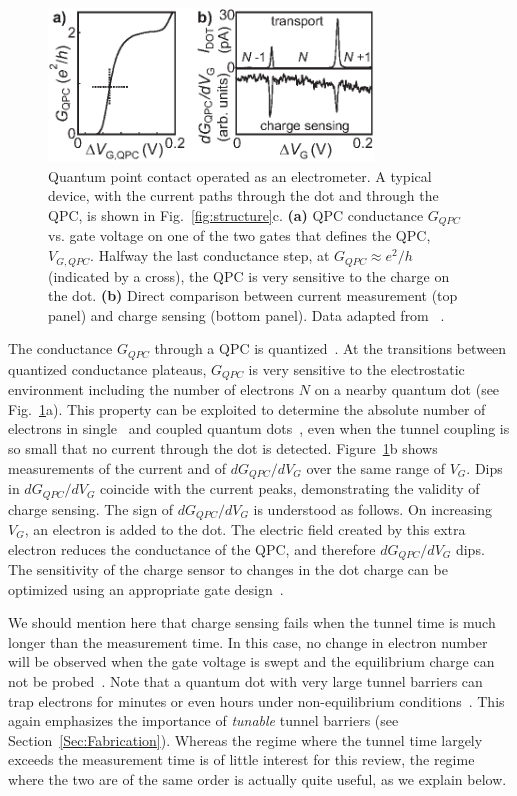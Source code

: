 \documentclass[rmp,twocolumn,aps]{revtex4}
\begin{document}
\begin{figure}[htb]
\includegraphics[width=3.4in]{hanson_fig11.eps}
\caption{Quantum point contact operated as an electrometer. A typical device, with the current paths through the dot and through the QPC, is shown in Fig.~\ref{fig:structure}c.
\textbf{(a)} QPC conductance $G_{QPC}$ vs. gate voltage on one of
the two gates that defines the QPC, $V_{G,QPC}$. Halfway the last
conductance step, at $G_{QPC}\approx e^2/h$ (indicated by a
cross), the QPC is very sensitive to the charge on the dot.
\textbf{(b)} Direct comparison between current measurement (top
panel) and charge sensing (bottom panel). Data adapted from
~\textcite{ElzermanPRB2003}.} \label{fig:chargesensing}
\end{figure}

The conductance $G_{QPC}$ through a QPC is
quantized~\cite{WeesQPC88,WharamQPC88}. At the transitions between
quantized conductance plateaus, $G_{QPC}$ is very sensitive to the
electrostatic environment including the number of electrons $N$ on
a nearby quantum dot (see Fig.~\ref{fig:chargesensing}a). This
property can be exploited to determine the absolute number of
electrons in single~\cite{Sprinzak2002} and coupled quantum
dots~\cite{ElzermanPRB2003}, even when the tunnel coupling is so
small that no current through the dot is detected.
Figure~\ref{fig:chargesensing}b shows measurements of the current
and of $dG_{QPC}/dV_{G}$ over the same range of $V_{G}$. Dips in
$dG_{QPC}/dV_{G}$ coincide with the current peaks, demonstrating
the validity of charge sensing. The sign of $dG_{QPC}/dV_{G}$ is
understood as follows. On increasing $V_G$, an electron is added
to the dot. The electric field created by this extra electron
reduces the conductance of the QPC, and therefore
$dG_{QPC}/dV_{G}$ dips. The sensitivity of the charge sensor to
changes in the dot charge can be optimized using an appropriate
gate design~\cite{zhang04}.

We should mention here that charge sensing fails when the tunnel time is much longer than the measurement time. In this case, no change in electron number will be observed when the gate voltage is swept and the equilibrium charge can not be probed~\cite{RushforthPRB2004}. Note that a quantum dot with very large tunnel barriers can trap electrons for minutes or even hours under non-equilibrium conditions~\cite{CooperPhysE2000}. This again emphasizes the importance of \textit{tunable} tunnel barriers (see Section~\ref{Sec:Fabrication}). Whereas the regime where the tunnel time largely exceeds the measurement time is of little interest for this review, the regime where the two are of the same order is actually quite useful, as we explain below.
\end{document}
